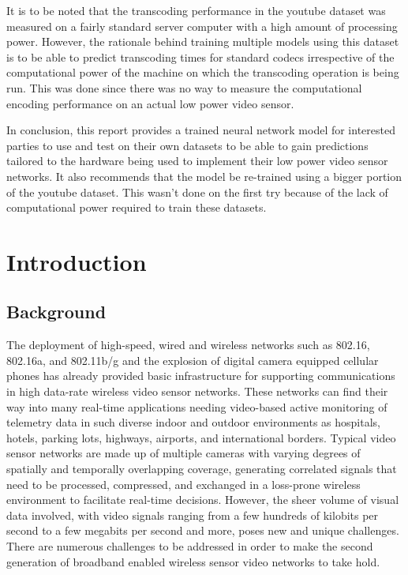 \documentclass[letterpaper,12pt,titlepage,oneside,final]{report}
\begin{document}
    It is to be noted that the transcoding performance in the youtube dataset was measured on a fairly standard server computer with a high amount of processing power. However, the rationale behind training multiple models using this dataset is to be able to predict transcoding times for standard codecs irrespective of the computational power of the machine on which the transcoding operation is being run. This was done since there was no way to measure the computational encoding performance on an actual low power video sensor.

    In conclusion, this report provides a trained neural network model for interested parties to use and test on their own datasets to be able to gain predictions tailored to the hardware being used to implement their low power video sensor networks. It also recommends that the model be re-trained using a bigger portion of the youtube dataset. This wasn't done on the first try because of the lack of computational power required to train these datasets.
\cleardoublepage

\chapter{Introduction}
    \section{Background}

        The deployment of high-speed, wired and wireless networks such as 802.16, 802.16a, and 802.11b/g and the explosion of digital camera equipped cellular phones has already provided basic infrastructure for supporting communications in high data-rate wireless video sensor networks. These networks can find their way into many real-time applications needing video-based active monitoring of telemetry data in such diverse indoor and outdoor environments as hospitals, hotels, parking lots, highways, airports, and international borders. Typical video sensor networks are made up of multiple cameras with varying degrees of spatially and temporally overlapping coverage, generating correlated signals that need to be processed, compressed, and exchanged in a loss-prone wireless environment to facilitate real-time decisions. However, the sheer volume of visual data involved, with video signals ranging from a few hundreds of kilobits per second to a few megabits per second and more, poses new and unique challenges. There are numerous challenges to be addressed in order to make the second generation of broadband enabled wireless sensor video networks to take hold.
\end{document}
